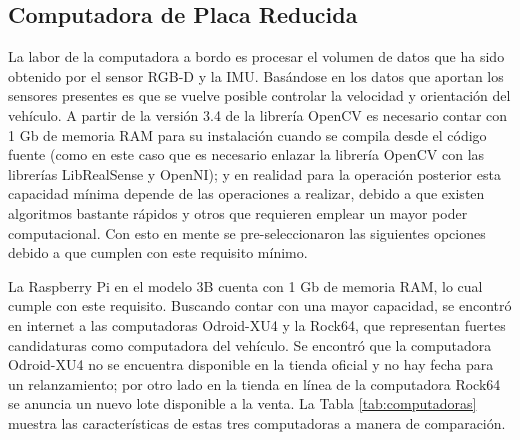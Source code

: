 \subsection{Computadora de Placa Reducida}
\label{ssec:comp}
La labor de la computadora a bordo es procesar el volumen de datos que ha sido obtenido por el sensor RGB-D y la IMU. Basándose en los datos que aportan los sensores presentes es que se vuelve posible controlar la velocidad y orientación del vehículo. A partir de la versión 3.4 de la librería OpenCV es necesario contar con 1 Gb de memoria RAM para su instalación cuando se compila desde el código fuente (como en este caso que es necesario enlazar la librería OpenCV con las librerías LibRealSense y OpenNI); y en realidad para la operación posterior esta capacidad mínima depende de las operaciones a realizar, debido a que existen algoritmos bastante rápidos y otros que requieren emplear un mayor poder computacional. Con esto en mente se pre-seleccionaron las siguientes opciones debido a que cumplen con este requisito mínimo.
\par La Raspberry Pi en el modelo 3B cuenta con 1 Gb de memoria RAM, lo cual cumple con este requisito. Buscando contar con una mayor capacidad, se encontró en internet a las computadoras Odroid-XU4 y la Rock64, que representan fuertes candidaturas como computadora del vehículo. Se encontró que la computadora Odroid-XU4 no se encuentra disponible en la tienda oficial y no hay fecha para un relanzamiento; por otro lado en la tienda en línea de la computadora Rock64 se anuncia un nuevo lote disponible a la venta. La Tabla \ref{tab:computadoras} muestra las características de estas tres computadoras a manera de comparación.
